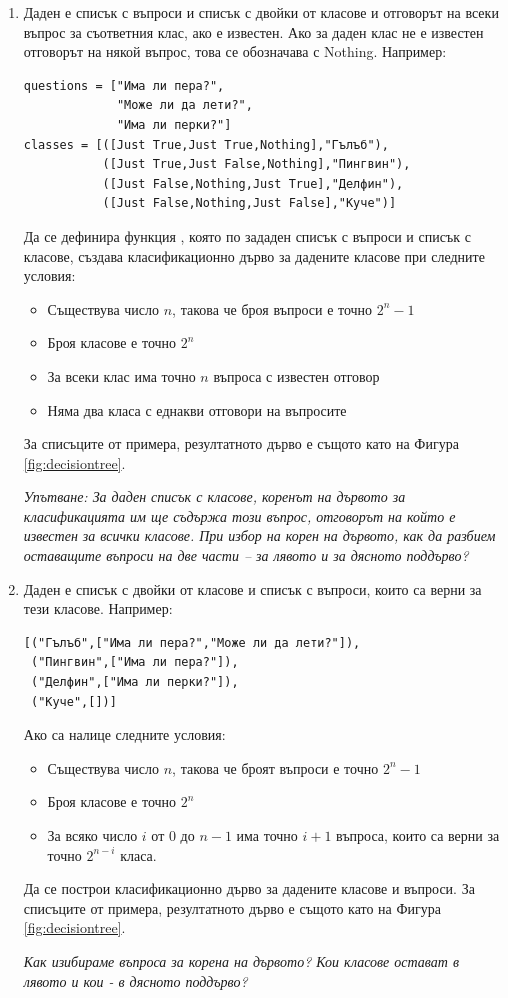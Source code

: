 \begin{enumerate}[resume]
	
	\item Даден е списък с въпроси  и списък с двойки от класове и отговорът на всеки въпрос за съответния клас, ако е известен. Ако за даден клас не е известен отговорът на някой въпрос, това се обозначава с Nothing. Например:
\begin{verbatim}
questions = ["Има ли пера?", 
             "Може ли да лети?", 
             "Има ли перки?"]
classes = [([Just True,Just True,Nothing],"Гълъб"),
           ([Just True,Just False,Nothing],"Пингвин"),
           ([Just False,Nothing,Just True],"Делфин"),
           ([Just False,Nothing,Just False],"Куче")]

\end{verbatim}
Да се дефинира функция , която по зададен списък с въпроси и списък с класове, създава класификационно дърво за дадените класове при следните условия:
\begin{itemize}
	\item Съществува число $n$, такова че броя въпроси е точно $2^n-1$
	\item Броя класове е точно $2^n$
	\item За всеки клас има точно $n$ въпроса с известен отговор
	\item Няма два класа с еднакви отговори на въпросите
\end{itemize}


За списъците от примера, резултатното дърво е същото като на Фигура \ref{fig:decisiontree}. 

\emph{Упътване: За даден списък с класове, коренът на дървото за класификацията им ще съдържа този въпрос, отговорът на който е известен за всички класове. При избор на корен на дървото, как да разбием оставащите въпроси на две части -- за лявото и за дясното поддърво?}

	\item Даден е списък с двойки от класове и списък с въпроси, които са верни за тези класове. Например:
\begin{verbatim}
[("Гълъб",["Има ли пера?","Може ли да лети?"]),
 ("Пингвин",["Има ли пера?"]),
 ("Делфин",["Има ли перки?"]),
 ("Куче",[])]
\end{verbatim}
Ако са налице следните условия:
\begin{itemize}
	\item Съществува число $n$, такова че броят въпроси е точно $2^n-1$
	\item Броя класове е точно $2^n$
	\item За всяко число $i$ от $0$ до $n-1$ има точно $i+1$ въпроса, които са верни за точно $2^{n-i}$ класа.
\end{itemize}
	Да се построи класификационно дърво за дадените класове и въпроси. За списъците от примера, резултатното дърво е същото като на Фигура \ref{fig:decisiontree}. 

	\emph{Как изибираме въпроса за корена на дървото? Кои класове остават в лявото и кои - в дясното поддърво?}


\end{enumerate}

